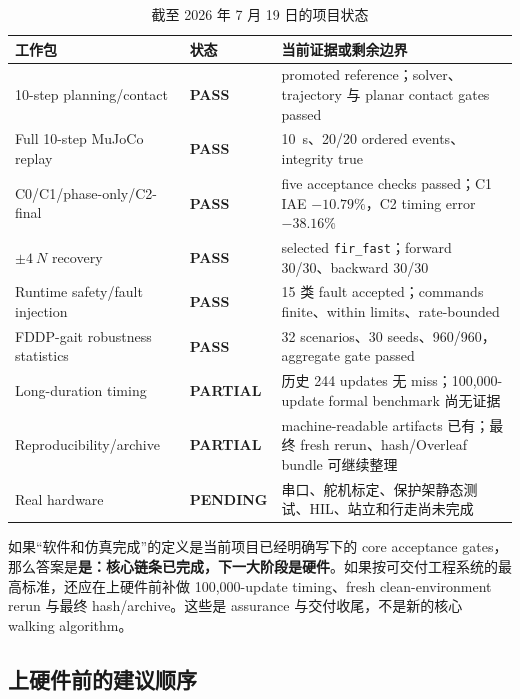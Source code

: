 \documentclass[UTF8,11pt,a4paper]{ctexart}
\newcommand{\code}[1]{\texttt{#1}}
\newcommand{\pass}{\textcolor{green!45!black}{\textbf{PASS}}}
\newcommand{\partialstatus}{\textcolor{orange!75!black}{\textbf{PARTIAL}}}
\newcommand{\pending}{\textcolor{blue!60!black}{\textbf{PENDING}}}
\begin{document}
\begin{table}[htbp]
\centering
\caption{截至 2026 年 7 月 19 日的项目状态}
\begin{tabularx}{\linewidth}{@{}p{3.7cm}p{1.7cm}X@{}}
\toprule
工作包 & 状态 & 当前证据或剩余边界 \\
\midrule
10-step planning/contact & \pass & promoted reference；solver、trajectory 与 planar contact gates passed \\
Full 10-step MuJoCo replay & \pass & \SI{10}{s}、20/20 ordered events、integrity true \\
C0/C1/phase-only/C2-final & \pass & five acceptance checks passed；C1 IAE $-10.79\%$，C2 timing error $-38.16\%$ \\
$\pm\SI{4}{N}$ recovery & \pass & selected \code{fir\_fast}；forward 30/30、backward 30/30 \\
Runtime safety/fault injection & \pass & 15 类 fault accepted；commands finite、within limits、rate-bounded \\
FDDP-gait robustness statistics & \pass & 32 scenarios、30 seeds、960/960，aggregate gate passed \\
Long-duration timing & \partialstatus & 历史 244 updates 无 miss；100,000-update formal benchmark 尚无证据 \\
Reproducibility/archive & \partialstatus & machine-readable artifacts 已有；最终 fresh rerun、hash/Overleaf bundle 可继续整理 \\
Real hardware & \pending & 串口、舵机标定、保护架静态测试、HIL、站立和行走尚未完成 \\
\bottomrule
\end{tabularx}
\end{table}

\begin{evidencebox}
如果“软件和仿真完成”的定义是当前项目已经明确写下的 core acceptance gates，那么答案是\textbf{是：核心链条已完成，下一大阶段是硬件}。如果按可交付工程系统的最高标准，还应在上硬件前补做 100,000-update timing、fresh clean-environment rerun 与最终 hash/archive。这些是 assurance 与交付收尾，不是新的核心 walking algorithm。
\end{evidencebox}

\subsection{上硬件前的建议顺序}
\end{document}
